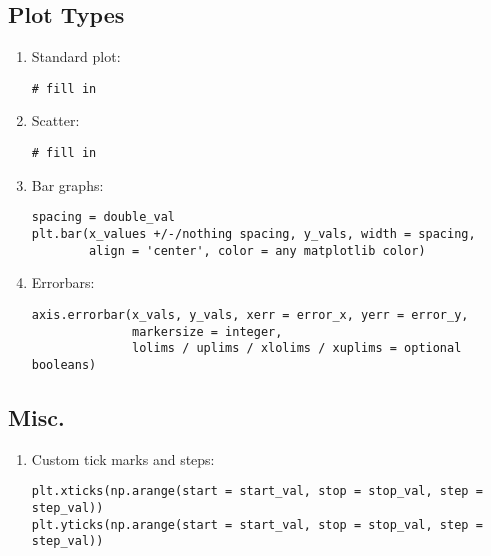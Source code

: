 \documentclass{article}
\begin{document}
\subsection{Plot Types}
\begin{enumerate}
    \item Standard plot:
    \begin{verbatim}
# fill in 
    \end{verbatim}
    \item Scatter:
    \begin{verbatim}
# fill in 
    \end{verbatim}
    \item Bar graphs:
    \begin{verbatim}
spacing = double_val
plt.bar(x_values +/-/nothing spacing, y_vals, width = spacing,
        align = 'center', color = any matplotlib color)
    \end{verbatim}
    \item Errorbars:
    \begin{verbatim}
axis.errorbar(x_vals, y_vals, xerr = error_x, yerr = error_y,
              markersize = integer,
              lolims / uplims / xlolims / xuplims = optional booleans)
    \end{verbatim}
\end{enumerate}

\subsection{Misc.}
\begin{enumerate}
    \item Custom tick marks and steps:
    \begin{verbatim}
plt.xticks(np.arange(start = start_val, stop = stop_val, step = step_val))
plt.yticks(np.arange(start = start_val, stop = stop_val, step = step_val))
    \end{verbatim}
\end{enumerate}
\end{document}
